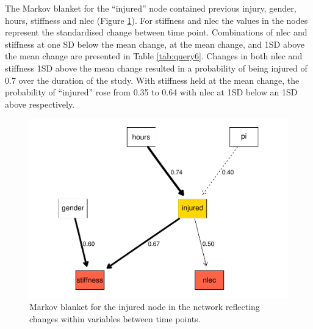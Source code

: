 \documentclass[
  english,
  man,floatsintext]{apa6}
\begin{document}
The Markov blanket for the \enquote{injured} node contained previous injury, gender, hours, stiffness and nlec (Figure \ref{fig:mb3}).
For stiffness and nlec the values in the nodes represent the standardised change between time point.
Combinations of nlec and stiffness at one SD below the mean change, at the mean change, and 1SD above the mean change are presented in Table \ref{tab:query6}.
Changes in both nlec and stiffness 1SD above the mean change resulted in a probability of being injured of 0.7 over the duration of the study.
With stiffness held at the mean change, the probability of \enquote{injured} rose from 0.35 to 0.64 with nlec at 1SD below an 1SD above respectively.

\begin{figure}[H]

{\centering \includegraphics[width=0.9\linewidth]{full_phd_files/figure-latex/mb3-1} 

}

\caption{Markov blanket for the injured node in the network reflecting changes within variables between time points.}\label{fig:mb3}
\end{figure}
\end{document}
